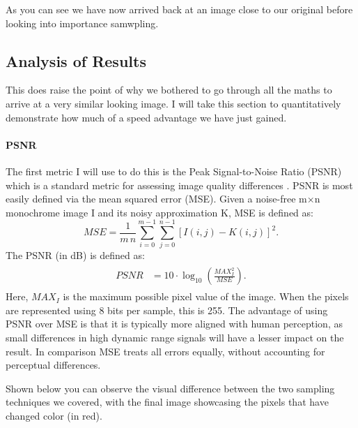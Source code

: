 \documentclass[12pt]{article}
\begin{document}
As you can see we have now arrived back at an image close to our original before looking into importance samwpling.

\subsection{Analysis of Results}

This does raise the point of why we bothered to go through all the maths to arrive at a very similar looking image. I will take this section to quantitatively demonstrate how much of a speed advantage we have just gained.

\paragraph{PSNR} The first metric I will use to do this is the Peak Signal-to-Noise Ratio (PSNR) which is a standard metric for assessing image quality differences \cite{imagequality}. PSNR is most easily defined via the mean squared error (MSE). Given a noise-free m×n monochrome image I and its noisy approximation K, MSE is defined as:
\[
    {\displaystyle {\mathit {MSE}}={\frac {1}{m\,n}}\sum _{i=0}^{m-1}\sum _{j=0}^{n-1}[I(i,j)-K(i,j)]^{2}.}
\]
The PSNR (in dB) is defined as:
\[
    \begin{array}{c} {\displaystyle {\begin{aligned}{\mathit {PSNR}}&=10\cdot \log _{10}\left({\frac {{\mathit {MAX}}_{I}^{2}}{\mathit {MSE}}}\right).\end{aligned}}} \end{array}
\]
Here, $MAX_I$ is the maximum possible pixel value of the image. When the pixels are represented using 8 bits per sample, this is 255. The advantage of using PSNR over MSE is that it is typically more aligned with human perception, as small differences in high dynamic range signals will have a lesser impact on the result. In comparison MSE treats all errors equally, without accounting for perceptual differences.

Shown below you can observe the visual difference between the two sampling techniques we covered, with the final image showcasing the pixels that have changed color (in red).
\end{document}
